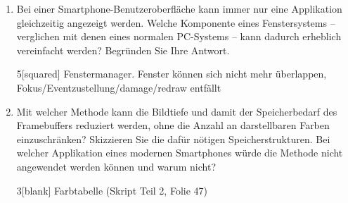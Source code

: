 
\begin{enumerate}

\item Bei einer Smartphone-Benutzeroberfläche kann immer nur eine Applikation
gleichzeitig angezeigt werden. Welche Komponente eines Fenstersystems --
verglichen mit denen eines normalen PC-Systems -- kann dadurch erheblich vereinfacht
werden? Begründen Sie Ihre Antwort.

\begin{solution}{5}[squared]
Fenstermanager. Fenster können sich nicht mehr überlappen,
Fokus/Eventzustellung/damage/redraw entfällt 
\end{solution}

\item Mit welcher Methode kann die Bildtiefe und damit der Speicherbedarf des
Framebuffers reduziert werden, ohne die Anzahl an darstellbaren Farben
einzuschränken? Skizzieren Sie die dafür nötigen Speicherstrukturen. Bei welcher
Applikation eines modernen Smartphones würde die Methode nicht angewendet werden
können und warum nicht?

\begin{solution}{3}[blank]
Farbtabelle (Skript Teil 2, Folie 47)
\end{solution}

\end{enumerate}
